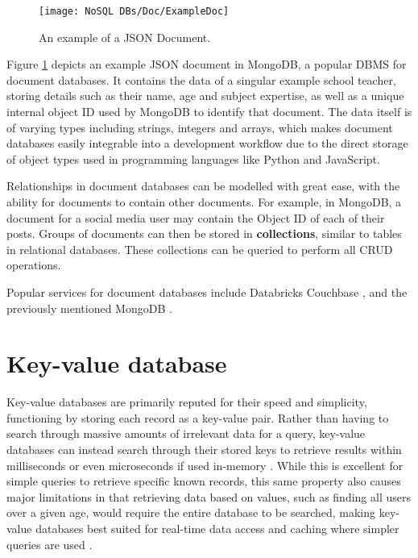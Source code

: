 
\begin{figure}[H]
    \centering  
    \texttt{[image: NoSQL DBs/Doc/ExampleDoc]}
    \caption{An example of a JSON Document.\label{fig:ExampleDoc}}
\end{figure}

\noindent Figure \ref{fig:ExampleDoc} depicts an example JSON document in MongoDB, a popular DBMS
for document databases. It contains the data of a singular example school teacher, storing details such as their name, age and subject expertise, as well as a unique internal object ID used by MongoDB to identify that document. The data itself is of varying types including 
strings, integers and arrays, which makes document databases easily integrable into a development workflow due to the direct 
storage of object types used in programming languages like Python and JavaScript.

\para Relationships in document databases can be modelled with great ease, with the ability for documents to contain other documents. 
For example, in MongoDB, a document for a social media user may contain the Object ID of each of their posts. Groups of documents can then
be stored in \textbf{collections}, similar to tables in relational databases. These collections can be queried to perform all CRUD operations. 


\para Popular services for document databases include Databricks \autocite{databricksDataAICompany2023} Couchbase \autocite{couchbaseCouchbaseBestFree}, and the previously mentioned MongoDB \autocite{mongodbDocumentDatabaseNoSQL}.


\section{Key-value database}
Key-value databases are primarily reputed for their speed and simplicity, functioning by storing each record as a key-value pair.
Rather than having to search through massive amounts of irrelevant data for a query, key-value databases can instead search 
through their stored keys to retrieve results within milliseconds or even microseconds if used in-memory \autocite{redisRedisFAQ}.
While this is excellent for simple queries to retrieve specific known records, this same property also causes major limitations in
that retrieving data based on values, such as finding all users over a given age, would require the entire database to be searched,
making key-value databases best suited for real-time data access and caching where simpler queries are used \autocite{mongodbWhatKeyValueDatabase}.

